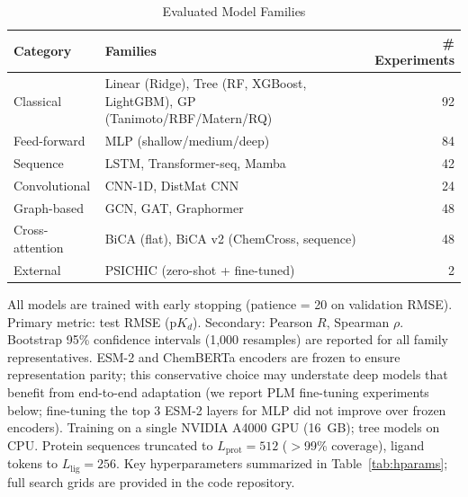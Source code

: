 \documentclass[pmlr,twocolumn]{jmlr}
\begin{document}
\begin{table}[t]
\centering
\small
\caption{Evaluated Model Families}
\label{tab:families}
\begin{tabular}{llr}
\toprule
\textbf{Category} & \textbf{Families} & \textbf{\# Experiments} \\
\midrule
Classical & Linear (Ridge), Tree (RF, XGBoost, LightGBM), GP (Tanimoto/RBF/Matern/RQ) & 92 \\
Feed-forward & MLP (shallow/medium/deep) & 84 \\
Sequence & LSTM, Transformer-seq, Mamba & 42 \\
Convolutional & CNN-1D, DistMat CNN & 24 \\
Graph-based & GCN, GAT, Graphormer & 48 \\
Cross-attention & BiCA (flat), BiCA v2 (ChemCross, sequence) & 48 \\
External & PSICHIC (zero-shot + fine-tuned) & 2 \\
\bottomrule
\end{tabular}
\end{table}

All models are trained with early stopping (patience = 20 on validation RMSE). Primary metric: test RMSE (p$K_d$). Secondary: Pearson $R$, Spearman $\rho$. Bootstrap 95\% confidence intervals (1,000 resamples) are reported for all family representatives. ESM-2 and ChemBERTa encoders are frozen to ensure representation parity; this conservative choice may understate deep models that benefit from end-to-end adaptation (we report PLM fine-tuning experiments below; fine-tuning the top 3 ESM-2 layers for MLP did not improve over frozen encoders). Training on a single NVIDIA A4000 GPU (16~GB); tree models on CPU. Protein sequences truncated to $L_\text{prot}=512$ ($>$99\% coverage), ligand tokens to $L_\text{lig}=256$. Key hyperparameters summarized in Table~\ref{tab:hparams}; full search grids are provided in the code repository.
\end{document}
